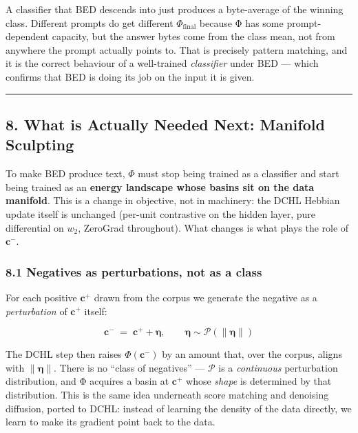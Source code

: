 \documentclass[
  11pt,
  a4paper,
]{article}
\begin{document}
A classifier that BED descends into just produces a byte-average of the
winning class. Different prompts do get different
\(\Phi_{\text{final}}\) because Φ has some prompt-dependent capacity,
but the answer bytes come from the class mean, not from anywhere the
prompt actually points to. That is precisely pattern matching, and it is
the correct behaviour of a well-trained \emph{classifier} under BED ---
which confirms that BED is doing its job on the input it is given.

\begin{center}\rule{0.5\linewidth}{0.5pt}\end{center}

\subsection{8. What is Actually Needed Next: Manifold
Sculpting}\label{what-is-actually-needed-next-manifold-sculpting}

To make BED produce text, \(\Phi\) must stop being trained as a
classifier and start being trained as an \textbf{energy landscape whose
basins sit on the data manifold}. This is a change in objective, not in
machinery: the DCHL Hebbian update itself is unchanged (per-unit
contrastive on the hidden layer, pure differential on \(w_2\), ZeroGrad
throughout). What changes is what plays the role of \(\mathbf{c}^{-}\).

\subsubsection{8.1 Negatives as perturbations, not as a
class}\label{negatives-as-perturbations-not-as-a-class}

For each positive \(\mathbf{c}^{+}\) drawn from the corpus we generate
the negative as a \emph{perturbation} of \(\mathbf{c}^{+}\) itself:

\[
\mathbf{c}^{-} \;=\; \mathbf{c}^{+} + \boldsymbol{\eta}, \qquad \boldsymbol{\eta} \sim \mathcal{P}(\lVert \boldsymbol{\eta} \rVert)
\]

The DCHL step then raises \(\Phi(\mathbf{c}^{-})\) by an amount that,
over the corpus, aligns with \(\lVert \boldsymbol{\eta} \rVert\). There
is no ``class of negatives'' --- \(\mathcal{P}\) is a \emph{continuous}
perturbation distribution, and Φ acquires a basin at \(\mathbf{c}^{+}\)
whose \emph{shape} is determined by that distribution. This is the same
idea underneath score matching and denoising diffusion, ported to DCHL:
instead of learning the density of the data directly, we learn to make
its gradient point back to the data.
\end{document}
